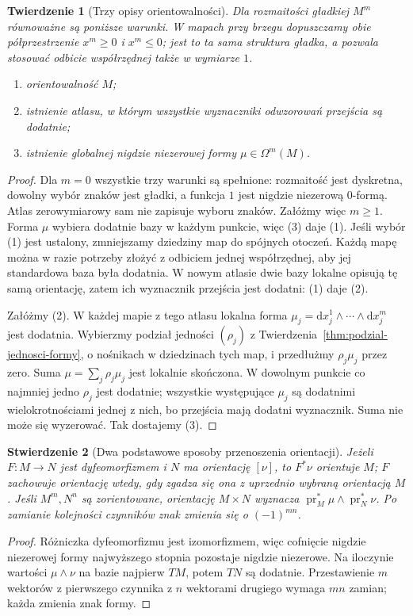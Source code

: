 \documentclass[11pt,a4paper,oneside]{report}
\newcommand{\pr}{\operatorname{pr}}
\newcommand{\dd}{\mathrm d}
\theoremstyle{plain}
\newtheorem{twierdzenie}{Twierdzenie}[section]
\newtheorem{stwierdzenie}[twierdzenie]{Stwierdzenie}
\theoremstyle{definition}
\theoremstyle{remark}
\begin{document}
\begin{twierdzenie}[Trzy opisy orientowalności]
\label{thm:orientacja-atlas-forma}
Dla rozmaitości gładkiej $M^m$ równoważne są
poniższe warunki. W mapach przy brzegu dopuszczamy
obie półprzestrzenie $x^m\geq0$ i $x^m\leq0$;
jest to ta sama struktura gładka, a pozwala stosować
odbicie współrzędnej także w wymiarze $1$.
\begin{enumerate}[leftmargin=*]
\item orientowalność $M$;
\item istnienie atlasu, w którym wszystkie wyznaczniki
      odwzorowań przejścia są dodatnie;
\item istnienie globalnej nigdzie niezerowej formy
      $\mu\in\Omega^m(M)$.
\end{enumerate}
\end{twierdzenie}
\begin{proof}
Dla $m=0$ wszystkie trzy warunki są spełnione:
rozmaitość jest dyskretna, dowolny wybór znaków jest
gładki, a funkcja $1$ jest nigdzie niezerową $0$-formą.
Atlas zerowymiarowy sam nie zapisuje wyboru znaków.
Załóżmy więc $m\geq1$.
Forma $\mu$ wybiera dodatnie bazy w każdym punkcie,
więc (3) daje (1). Jeśli wybór (1) jest ustalony,
zmniejszamy dziedziny map do spójnych otoczeń.
Każdą mapę można w razie potrzeby złożyć z odbiciem
jednej współrzędnej, aby jej standardowa baza była
dodatnia. W nowym atlasie dwie bazy lokalne opisują
tę samą orientację, zatem ich wyznacznik przejścia
jest dodatni: (1) daje (2).

Załóżmy (2). W każdej mapie z tego atlasu lokalna
forma $\mu_j=\dd x_j^1\wedge\cdots\wedge\dd x_j^m$
jest dodatnia. Wybierzmy podział jedności $(\rho_j)$
z Twierdzenia~\ref{thm:podzial-jednosci-formy},
o nośnikach w dziedzinach tych map, i przedłużmy
$\rho_j\mu_j$ przez zero. Suma
$\mu=\sum_j\rho_j\mu_j$ jest lokalnie skończona.
W dowolnym punkcie co najmniej jedno $\rho_j$ jest
dodatnie; wszystkie występujące $\mu_j$ są dodatnimi
wielokrotnościami jednej z nich, bo przejścia
mają dodatni wyznacznik. Suma nie może się
wyzerować. Tak dostajemy (3).
\end{proof}

\begin{stwierdzenie}[Dwa podstawowe sposoby przenoszenia orientacji]
\label{prop:orientacja-iloczyn-pullback}
Jeżeli $F:M\to N$ jest dyfeomorfizmem i $N$ ma
orientację $[\nu]$, to $F^*\nu$ orientuje $M$;
$F$ zachowuje orientację wtedy, gdy zgadza się ona
z uprzednio wybraną orientacją $M$. Jeśli $M^m,N^n$
są zorientowane, orientację $M\times N$ wyznacza
$\pr_M^*\mu\wedge\pr_N^*\nu$.
Po zamianie kolejności czynników znak zmienia się
o $(-1)^{mn}$.
\end{stwierdzenie}
\begin{proof}
Różniczka dyfeomorfizmu jest izomorfizmem, więc
cofnięcie nigdzie niezerowej formy najwyższego stopnia
pozostaje nigdzie niezerowe. Na iloczynie wartości
$\mu\wedge\nu$ na bazie najpierw $TM$, potem $TN$
są dodatnie. Przestawienie $m$ wektorów z pierwszego
czynnika z $n$ wektorami drugiego wymaga $mn$
zamian; każda zmienia znak formy.
\end{proof}
\end{document}
